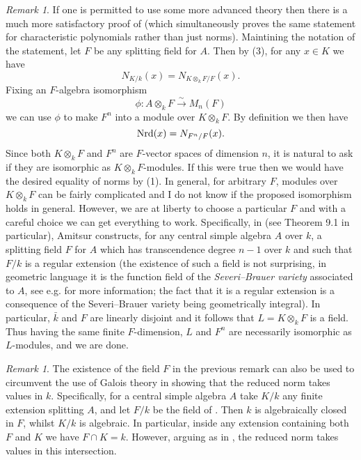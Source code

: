 \documentclass[11pt]{amsart}
\numberwithin{equation}{section}
\theoremstyle{remark}
\newtheorem{remark}[equation]{Remark}
\theoremstyle{remark}
\theoremstyle{remark}
\theoremstyle{definition}
\theoremstyle{definition}
\theoremstyle{definition}
\theoremstyle{definition}
\theoremstyle{definition}
\theoremstyle{definition}
\begin{document}
\begin{remark} \label{generic isomorphism remark}
If one is permitted to use some more advanced theory then there is a much more satisfactory proof of  (which simultaneously proves the same statement for characteristic polynomials rather than just norms). Maintining the notation of the statement, let $F$ be any splitting field for $A$. Then by  (3), for any $x\in K$ we have
\[N_{K/k}(x)=N_{K\otimes_k F/F}(x).\]
Fixing an $F$-algebra isomorphism
\[\phi:A\otimes_k F\stackrel{\sim}{\longrightarrow}M_n(F)\]
we can use $\phi$ to make $F^n$ into a module over $K\otimes_k F$. By definition we then have
\[\textup{Nrd}(x)=N_{F^n/F}(x).\]  
Since both $K\otimes_k F$ and $F^n$ are $F$-vector spaces of dimension $n$, it is natural to ask if they are isomorphic as $K\otimes_k F$-modules. If this were true then we would have the desired equality of norms by  (1). In general, for arbitrary $F$, modules over $K\otimes_k F$ can be fairly complicated and I do not know if the proposed isomorphism  holds in general. However, we are at liberty to choose a particular $F$ and with a careful choice we can get everything to work. Specifically, in \cite{MR0070624} (see Theorem 9.1 in particular), Amitsur constructs, for any central simple algebra $A$ over $k$, a splitting field $F$ for $A$ which has transcendence degree $n-1$ over $k$ and such that $F/k$ is a regular extension (the existence of such a field is not surprising, in geometric language it is the function field of the \textit{Severi--Brauer variety} associated to $A$, see e.g. \cite[Section 5]{MR2266528} for more information; the fact that it is a regular extension is a consequence of the Severi--Brauer variety being geometrically integral). In particular, $\bar{k}$ and $F$ are linearly disjoint and it follows that $L=K\otimes_k F$ is a field. Thus having the same finite $F$-dimension, $L$ and $F^n$ are necessarily isomorphic as $L$-modules, and we are done.
\end{remark}

\begin{remark}
The existence of the field $F$ in the previous remark can also be used to circumvent the use of Galois theory in showing that the reduced norm takes values in $k$. Specifically, for a central simple algebra $A$ take $K/k$ any finite extension splitting $A$, and let $F/k$ be the field of . Then $k$ is algebraically closed in $F$, whilst $K/k$ is algebraic. In particular, inside any extension  containing both $F$ and $K$ we have $F\cap K=k$.  However, arguing as in , the reduced norm  takes values in this intersection. 
\end{remark}
\end{document}
